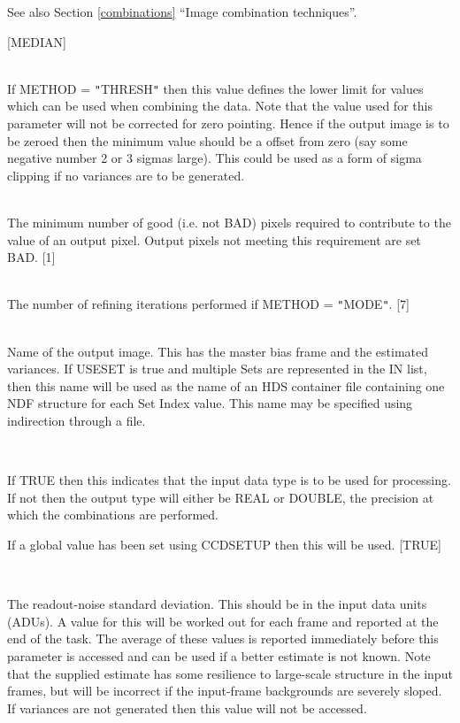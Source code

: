 \documentclass[twoside,11pt]{article}
\newcommand{\htmlref}[2]{#1}
\newcommand{\latexhtml}[2]{#1}
\renewcommand{\_}{\texttt{\symbol{95}}}
\newcommand{\qt}[1]{{\tt "}#1{\tt "}}
\newcommand{\xroutine}[1]{\htmlref{{\sc #1}}{#1}}
\newcommand{\secref}[2]{\latexhtml{Section \ref{#1} ``#2''}{``\htmlref{#2}{#1}''}}
\newcommand{\sstsubsection}[1]{ \item[{#1}] \mbox{} \\}
\newcommand{\sstsubsection}[1]{\item[{#1}]}
\begin{document}
{{{{         }
         See also \secref{combinations}{Image combination techniques}.

         [MEDIAN]
      }
      \sstsubsection{
         MIN = \_REAL (Read)
      } {
         If METHOD = \qt{THRESH} then this value defines the lower limit
         for values which can be used when combining the data. Note that
         the value used for this parameter will not be corrected for zero
         pointing. Hence if the output image is to be zeroed then the
         minimum value should be a offset from zero (say some negative
         number 2 or 3 sigmas large). This could be used as a form of
         sigma clipping if no variances are to be generated.
      }
      \sstsubsection{
         MINPIX = \_INTEGER (Read)
      } {
         The minimum number of good (i.e. not BAD) pixels required
         to contribute to the value of an output pixel. Output pixels
         not meeting this requirement are set BAD.
         [1]
      }
      \sstsubsection{
         NITER = \_INTEGER (Read)
      } {
         The number of refining iterations performed if METHOD = \qt{MODE}.
         [7]
      }
      \sstsubsection{
         OUT = LITERAL (Read)
      } {
         Name of the output image. This has the master bias frame and
         the estimated variances.  If USESET is true and multiple Sets
         are represented in the IN list, then this name will be used
         as the name of an HDS container file containing one NDF structure for
         each Set Index value.  
         This name may be specified using indirection through a file.
      }
      \sstsubsection{
         PRESERVE = \_LOGICAL (Read)
      } {
         If TRUE then this indicates that the input data type is to be
         used for processing. If not then the output type will either
         be \_REAL or \_DOUBLE, the precision at which the combinations
         are performed.

         If a global value has been set using \xroutine{CCDSETUP} then this will
         be used.
         [TRUE]
      }
      \sstsubsection{
         RNOISE = \_DOUBLE (Read)
      } {
         The readout-noise standard deviation. This should be in the
         input data units (ADUs). A value for this will be worked out
         for each frame and reported at the end of the task. The
         average of these values is reported immediately before this
         parameter is accessed and can be used if a better estimate is
         not known. Note that the supplied estimate has some resilience
         to large-scale structure in the input frames, but will be
         incorrect if the input-frame backgrounds are severely sloped.
         If variances are not generated then this value will not be
         accessed.

}}}
\end{document}

